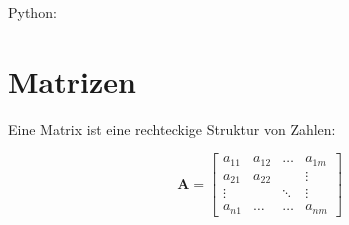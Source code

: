 Python: 

\section{Matrizen}



Eine Matrix ist eine rechteckige Struktur von Zahlen:


\begin{equation}
\mathbf{A} = \begin{bmatrix} a_{11} & a_{12} & \dots & a_{1m} \\
                    a_{21} & a_{22} &       &  \vdots   \\
                    \vdots &        &\ddots &  \vdots \\
                    a_{n 1} & \dots & \dots & a_{n m}
 \end{bmatrix}
\end{equation}



